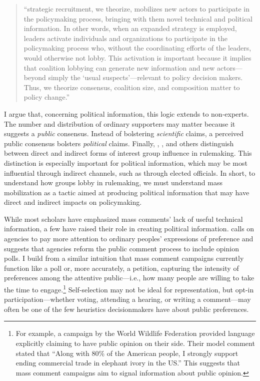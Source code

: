 \documentclass[
      12pt,
        ]{article}
\begin{document}
\begin{quote}
``strategic recruitment, we theorize, mobilizes new actors to
participate in the policymaking process, bringing with them novel
technical and political information. In other words, when an expanded
strategy is employed, leaders activate individuals and organizations
to participate in the policymaking process who, without the
coordinating efforts of the leaders, would otherwise not lobby. This
activation is important because it implies that coalition lobbying can
generate new information and new actors---beyond simply the `usual
suspects'---relevant to policy decision makers. Thus, we theorize
consensus, coalition size, and composition matter to policy change.''
\end{quote}

I argue that, concerning political information, this logic extends to
non-experts. The number and distribution of ordinary supporters may
matter because it suggests a \emph{public} consensus. Instead of bolstering
\emph{scientific} claims, a perceived public consensus bolsters \emph{political}
claims. Finally, \citet{Furlong1998}, \citet{Yackee2006JPART}, and others distinguish
between direct and indirect forms of interest group influence in
rulemaking. This distinction is especially important for political
information, which may be most influential through indirect channels,
such as through elected officials. In short, to understand how groups
lobby in rulemaking, we must understand mass mobilization as a tactic
aimed at producing political information that may have direct and
indirect impacts on policymaking.

While most scholars have emphasized mass comments' lack of useful
technical information, a few have raised their role in creating
political information. \citet{Cuellar2005} calls on agencies to pay more
attention to ordinary peoples' expressions of preference and \citet{Rauch2016}
suggests that agencies reform the public comment process to include
opinion polls. I build from a similar intuition that mass comment
campaigns currently function like a poll or, more accurately, a
petition, capturing the intensity of preferences among the attentive
public---i.e., how many people are willing to take the time to
engage.\footnote{For example, a campaign by the World Wildlife Federation provided
  language explicitly claiming to have public opinion on their side.
  Their model comment stated that ``Along with 80\% of the American
  people, I strongly support ending commercial trade in elephant ivory
  in the US.'' This suggests that mass comment campaigns aim to signal
  information about public opinion.} Self-selection may not be ideal for representation, but
opt-in participation---whether voting, attending a hearing, or writing a
comment---may often be one of the few heuristics decisionmakers have
about public preferences.
\end{document}
